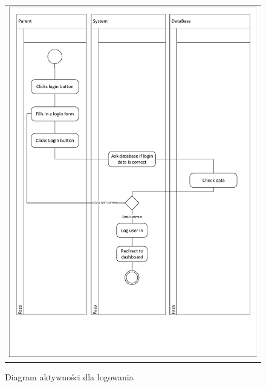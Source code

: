 \documentclass{sprawozdanie-agh}
\begin{document}
			\begin{figure}[H]
				\centering
				\begin{tabular}{c}
					\includegraphics[width=.95\textwidth]{Login_cropped} 
				\end{tabular}
			\caption{Diagram aktywności dla logowania}
			\end{figure}
\end{document}
